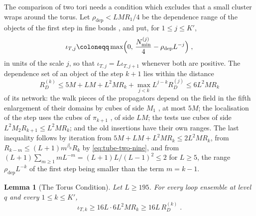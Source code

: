 \documentclass[11pt]{preprint}
\numberwithin{equation}{section}
\newtheorem{lemma}[theorem]{Lemma}
\theoremstyle{definition}
\theoremstyle{remark}
\theoremstyle{plain}
\begin{document}
The comparison of two tori needs a condition which excludes that a small cluster wraps around the torus. Let $\rho_{\mathrm{dep}} < LMR_1/4$ be the dependence range of the objects of the first step in fine bonds \cite[Sections~E.9.2 and~E.10.4]{WilsonFirstStep}, and put, for $1 \leq j \leq K'$,
\begin{equation}\label{eq:torus-margin}
    \iota_{T,j} \coloneqq \max\Bigl(0,\, \frac{N^{(j)}_{\min}}{4} - \rho_{\mathrm{dep}}L^{-j}\Bigr)\;,
\end{equation}
in units of the scale $j$, so that $\iota_{T,j} = L\iota_{T,j+1}$ whenever both are positive. The dependence set of an object of the step $k + 1$ lies within the distance
\begin{equation}\label{eq:dependence-range}
    R^{(k)}_D \leq 5M + LM + L^2MR_k + \max_{j<k}L^{j-k}R^{(j)}_D \leq 6L^2MR_k
\end{equation}
of its network: the walk pieces of the propagators depend on the field in the fifth enlargement of their domains by cubes of side $M_1$ \cite[Theorem~3.10, p.~416]{BalabanPBG}, at most $5M$; the localisation of the step uses the cubes of $\pi_{k+1}$ \cite[p.~13]{BalabanRG2}, of side $LM$; the tests use cubes of side $L^2M_2R_{k+1} \leq L^2MR_k$; and the old insertions have their own ranges. The last inequality follows by iteration from $5M + LM + L^2MR_k \leq 2L^2MR_k$, from $R_{k-m} \leq (L + 1)m^{\beta_0}R_k$ by \eqref{eq:tube-two-nine}, and from $(L + 1)\sum_{m \geq 1}mL^{-m} = (L + 1)L/(L - 1)^2 \leq 2$ for $L \geq 5$, the range $\rho_{\mathrm{dep}}L^{-k}$ of the first step being smaller than the term $m = k - 1$.

\begin{lemma}[The Torus Condition]\label{lem:torus-condition}
Let $L \geq 195$. For every loop ensemble at level $q$ and every $1 \leq k \leq K'$,
\begin{equation}\label{eq:torus-condition}
    \iota_{T,k} \geq 16L\cdot 6L^2MR_k \geq 16L\,R^{(k)}_D\;.
\end{equation}
\end{lemma}
\end{document}
